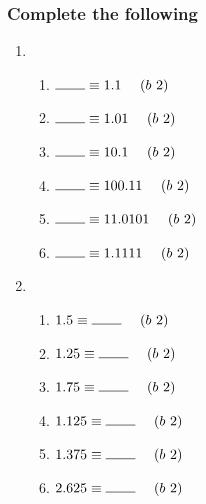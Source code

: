 \documentclass[a4paper,12pt]{article}
\begin{document}
\subsubsection{Complete the following}
\begin{enumerate}
\item ~ \begin{multicols}{2}
\begin{enumerate}[label= \roman*)]
\item $\rule{7.5mm}{0.15mm} \equiv 1.1 ~~~~(b~2)$
\item $\rule{7.5mm}{0.15mm} \equiv 1.01 ~~~~(b~2)$
\item $\rule{7.5mm}{0.15mm} \equiv 10.1 ~~~~(b~2)$
\item $\rule{7.5mm}{0.15mm} \equiv 100.11 ~~~~(b~2)$
\item $\rule{7.5mm}{0.15mm} \equiv 11.0101 ~~~~(b~2)$
\item $\rule{7.5mm}{0.15mm} \equiv 1.1111 ~~~~(b~2)$
\end{enumerate}
\end{multicols}
\item ~ \begin{multicols}{2}
\begin{enumerate}[label= \roman*)]
\item $1.5 \equiv \rule{7.5mm}{0.15mm}~~~~(b~2)$
\item $1.25 \equiv \rule{7.5mm}{0.15mm}~~~~(b~2)$
\item $1.75 \equiv \rule{7.5mm}{0.15mm}~~~~(b~2)$
\item $1.125 \equiv \rule{7.5mm}{0.15mm}~~~~(b~2)$
\item $1.375 \equiv \rule{7.5mm}{0.15mm}~~~~(b~2)$
\item $2.625 \equiv \rule{7.5mm}{0.15mm}~~~~(b~2)$
\end{enumerate}
\end{multicols}
\end{enumerate}
\end{document}
